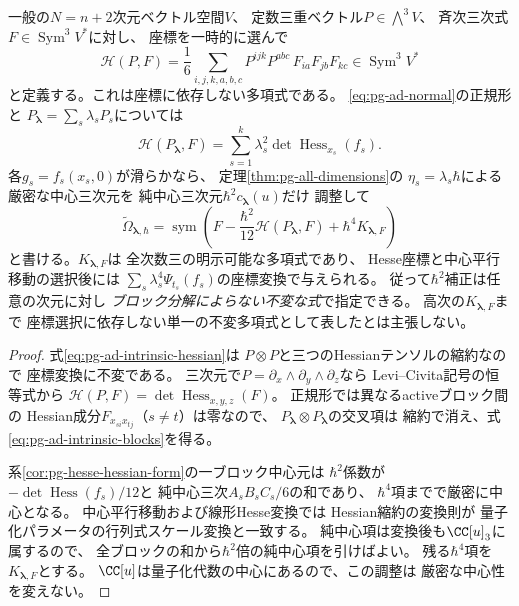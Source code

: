 \begin{proposition}[次元に依存しない内在的Hessian二次補正]
\label{prop:pg-ad-intrinsic-hessian}
一般の$N=n+2$次元ベクトル空間$V$、
定数三重ベクトル$P\in\bigwedge^3V$、
斉次三次式$F\in\operatorname{Sym}^3V^*$に対し、
座標を一時的に選んで
\begin{equation}
 \mathscr H(P,F)=
 \frac16\sum_{i,j,k,a,b,c}
 P^{ijk}P^{abc}\,
 F_{ia}F_{jb}F_{kc}\in\operatorname{Sym}^3V^*
 \label{eq:pg-ad-intrinsic-hessian}
\end{equation}
と定義する。これは座標に依存しない多項式である。
\eqref{eq:pg-ad-normal}の正規形と
$P_{\boldsymbol\lambda}=\sum_s\lambda_sP_s$については
\begin{equation}
 \mathscr H(P_{\boldsymbol\lambda},F)
 =\sum_{s=1}^k\lambda_s^2
  \det\operatorname{Hess}_{x_s}(f_s).
 \label{eq:pg-ad-intrinsic-blocks}
\end{equation}
各$g_s=f_s(x_s,0)$が滑らかなら、
定理\ref{thm:pg-all-dimensions}の
$\eta_s=\lambda_s\hbar$による厳密な中心三次元を
純中心三次元$\hbar^2c_{\boldsymbol\lambda}(u)$だけ
調整して
\begin{equation}
 \boxed{\quad
 \widetilde\Omega_{\boldsymbol\lambda,\hbar}
 =\operatorname{sym}\left(
 F-\frac{\hbar^2}{12}\mathscr H(P_{\boldsymbol\lambda},F)
 +\hbar^4K_{\boldsymbol\lambda,F}
 \right)
 \quad}
 \label{eq:pg-ad-intrinsic-center}
\end{equation}
と書ける。$K_{\boldsymbol\lambda,F}$は
全次数三の明示可能な多項式であり、
Hesse座標と中心平行移動の選択後には
$\sum_s\lambda_s^4\Psi_{t_s}(f_s)$の座標変換で与えられる。
従って$\hbar^2$補正は任意の次元に対し
\emph{ブロック分解によらない不変な式}で指定できる。
高次の$K_{\boldsymbol\lambda,F}$まで
座標選択に依存しない単一の不変多項式として表したとは主張しない。
\end{proposition}
\begin{proof}
式\eqref{eq:pg-ad-intrinsic-hessian}は
$P\otimes P$と三つのHessianテンソルの縮約なので
座標変換に不変である。
三次元で$P=\partial_x\wedge\partial_y\wedge\partial_z$なら
Levi--Civita記号の恒等式から
$\mathscr H(P,F)=\det\operatorname{Hess}_{x,y,z}(F)$。
正規形では異なるactiveブロック間の
Hessian成分$F_{x_{si}x_{tj}}$（$s\ne t$）は零なので、
$P_{\boldsymbol\lambda}\otimes P_{\boldsymbol\lambda}$の交叉項は
縮約で消え、式\eqref{eq:pg-ad-intrinsic-blocks}を得る。

系\ref{cor:pg-hesse-hessian-form}の一ブロック中心元は
$\hbar^2$係数が
$-\det\operatorname{Hess}(f_s)/12$と
純中心三次$A_sB_sC_s/6$の和であり、
$\hbar^4$項までで厳密に中心となる。
中心平行移動および線形Hesse変換では
Hessian縮約の変換則が
量子化パラメータの行列式スケール変換と一致する。
純中心項は変換後も$\CC[u]_3$に属するので、
全ブロックの和から$\hbar^2$倍の純中心項を引けばよい。
残る$\hbar^4$項を$K_{\boldsymbol\lambda,F}$とする。
$\CC[u]$は量子化代数の中心にあるので、この調整は
厳密な中心性を変えない。
\end{proof}

